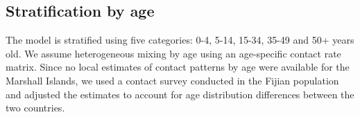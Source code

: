 \subsection{Stratification by age}
The model is stratified using five categories: 0-4, 5-14, 15-34, 35-49 and 50+ years old. We assume 
heterogeneous mixing by age using an age-specific contact rate matrix. Since no local estimates of 
contact patterns by age were available for the Marshall Islands, we used a contact survey conducted in 
the Fijian population and adjusted the estimates to account for age distribution differences between
the two countries.

